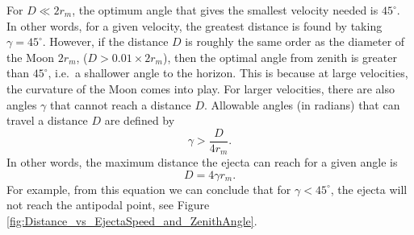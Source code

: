 \documentclass{hitec}
\numberwithin{equation}{section}
\begin{document}
For $D \ll 2r_m$, the optimum angle that gives the smallest velocity needed is $45^\circ$. In other words, for a given velocity, the greatest distance is found by taking $\gamma = 45^\circ$. However, if the distance $D$ is roughly the same order as the diameter of the Moon $2r_m$, ($D > 0.01\times 2r_m$), then the optimal angle from zenith is greater than $45^\circ$, i.e.\ a shallower angle to the horizon. This is because at large velocities, the curvature of the Moon comes into play. For larger velocities, there are also angles $\gamma$ that cannot reach a distance $D$. Allowable angles (in radians) that can travel a distance $D$ are defined by
\begin{equation}
\gamma > \frac{D}{4r_m}.
\end{equation}
In other words, the maximum distance the ejecta can reach for a given angle is
\begin{equation}\label{eq:max_D_gamma}
D = 4\gamma r_m.
\end{equation}
For example, from this equation we can conclude that for $\gamma < 45^\circ$, the ejecta will not reach the antipodal point, see Figure \ref{fig:Distance_vs_EjectaSpeed_and_ZenithAngle}.
\end{document}
